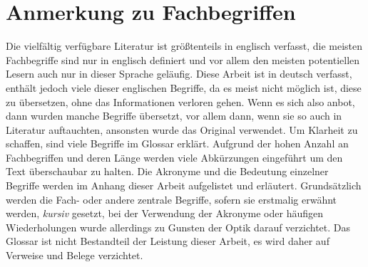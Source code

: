\section{Anmerkung zu Fachbegriffen}

Die vielfältig verfügbare Literatur ist größtenteils in englisch verfasst, die meisten Fachbegriffe sind nur in englisch definiert und vor allem den meisten potentiellen Lesern auch nur in dieser Sprache geläufig. Diese Arbeit ist in deutsch verfasst, enthält jedoch viele dieser englischen Begriffe, da es meist nicht möglich ist, diese zu übersetzen, ohne das Informationen verloren gehen. Wenn es sich also anbot, dann wurden manche Begriffe übersetzt, vor allem dann, wenn sie so auch in Literatur auftauchten, ansonsten wurde das Original verwendet. Um Klarheit zu schaffen, sind viele Begriffe im Glossar erklärt. Aufgrund der hohen Anzahl an Fachbegriffen und deren Länge werden viele Abkürzungen eingeführt um den Text überschaubar zu halten. Die Akronyme und die Bedeutung einzelner Begriffe werden im Anhang dieser Arbeit aufgelistet und erläutert. Grundsätzlich werden die Fach- oder andere zentrale Begriffe, sofern sie erstmalig erwähnt werden, \textit{kursiv} gesetzt, bei der Verwendung der Akronyme oder häufigen Wiederholungen wurde allerdings zu Gunsten der Optik darauf verzichtet. Das Glossar ist nicht Bestandteil der Leistung dieser Arbeit, es wird daher auf Verweise und Belege verzichtet.




